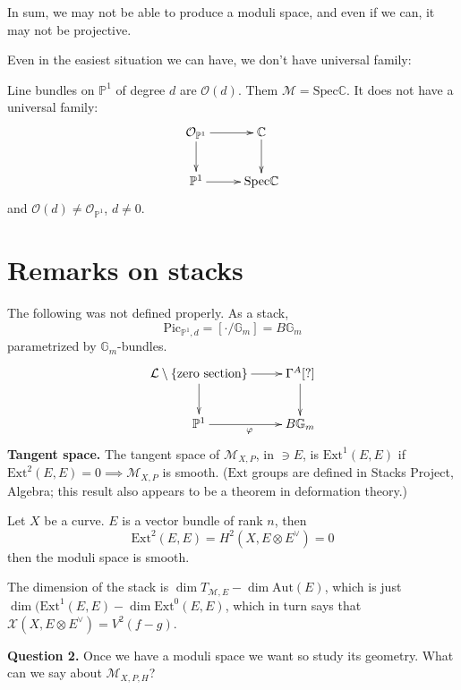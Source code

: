In sum, we may not be able to produce a moduli space, and even if we can, it may
not be projective.

\medskip\noindent
Even in the easiest situation we can have, we don't have universal family:

\begin{example}
\label{example-moduli-space-of-line-bundles-of-degree-d-over-P1-
do-not-have-universal-family}
Line bundles on $\mathbb{P}^1$ of degree $d$ are $\mathcal{O}(d)$. Them
$\mathcal{M}=\text{Spec}\mathbb{C}$. It does not have a universal family:
$$
\xymatrix{
\mathcal{O}_{\mathbb{P}^1}\ar[r]\ar[d]&\mathbb{C}\ar[d]\\
\mathbb{P}^1\ar[r]&\text{Spec}\mathbb{C}
}
$$
and $\mathcal{O}(d) \neq \mathcal{O}_{\mathbb{P}^1}$, $d\neq 0$.
\end{example}


\section{Remarks on stacks}
\label{section-remarks-on-stacks}

The following was not defined properly. As a stack,
$$
\text{Pic}_{\mathbb{P}^1,d}=\left[ \cdot/\mathbb{G}_m \right] = B\mathbb{G}_m
$$
parametrized by $\mathbb{G}_m$-bundles.
$$
\xymatrix{
\mathcal{L}\setminus\{\text{zero section}\}\ar[r]\ar[d]&\Gamma^A[?]\ar[d]\\
\mathbb{P}^1\ar[r]_\varphi&B\mathbb{G}_m
}
$$
\medskip\noindent
{\bf Tangent space.} The tangent space of $\mathcal{M}_{X,P}$, in $\ni E$, is
$\text{Ext}^1(E,E)$ if $\text{Ext}^2(E,E)=0 \implies  \mathcal{M}_{X,P}$ is
smooth. ($\text{Ext}$ groups are defined in Stacks Project, Algebra; this result
 also appears to be a theorem in deformation theory.)

\begin{example}
\label{example-moduli-space-of-curves-is-smooth}
Let $X$ be a curve. $E$ is a vector bundle of rank $n$, then
$$
\text{Ext}^2(E,E)=H^{2}(X,E \otimes E^{\vee})=0
$$
then the moduli space is smooth.
\end{example}

The dimension of the stack is $\dim T_{\mathcal{M},E}-\dim \text{Aut}(E)$, which
is just $\dim (\text{Ext}^1(E,E) - \dim \text{Ext}^0(E,E)$, which in turn says
that $\mathcal{X}(X,E \otimes E^\vee)=V^2(f-g)$.

\medskip\noindent
{\bf Question 2.} Once we have a moduli space we want so study its geometry. 
What can we say about $\mathcal{M}_{X,P,H}$?

